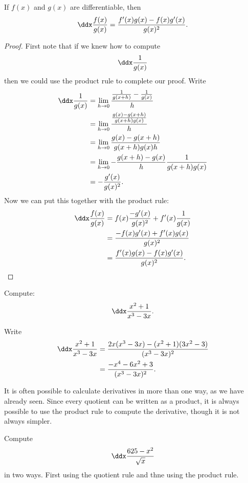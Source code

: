 \begin{mainTheorem}\label{theorem:quotient-rule}
If $f(x)$ and $g(x)$ are differentiable, then
\[
\ddx \frac{f(x)}{g(x)} = \frac{f'(x)g(x)-f(x)g'(x)}{g(x)^2}.
\]
\end{mainTheorem}
\begin{proof}
First note that if we knew how to compute
\[
\ddx \frac{1}{g(x)}
\]
then we could use the product rule to complete our proof.  Write
\begin{align*}
\ddx\frac{1}{g(x)}&=\lim_{h\to0} \frac{\frac{1}{g(x+h)}-\frac{1}{g(x)}}{h} \\
&=\lim_{h\to0} \frac{\frac{g(x)-g(x+h)}{g(x+h)g(x)}}{h} \\
&=\lim_{h\to0} \frac{g(x)-g(x+h)}{g(x+h)g(x)h} \\
&=\lim_{h\to0} -\frac{g(x+h)-g(x)}{h} \frac{1}{g(x+h)g(x)} \\
&=-\frac{g'(x)}{g(x)^2}.
\end{align*}
Now we can put this together with the product rule:
\begin{align*}
\ddx\frac{f(x)}{g(x)} &=f(x)\frac{-g'(x)}{g(x)^2}+f'(x)\frac{1}{g(x)}\\
&=\frac{-f(x)g'(x)+f'(x)g(x)}{g(x)^2}\\
&=\frac{f'(x)g(x)-f(x)g'(x)}{g(x)^2}.
\end{align*}

\end{proof}


\begin{example}
Compute:
\[
\ddx \frac{x^2+1}{x^3-3x}.
\]
\end{example}

\begin{solution}
Write
\begin{align*}
\ddx \frac{x^2+1}{x^3-3x} &= \frac{2x(x^3-3x)-(x^2+1)(3x^2-3)}{(x^3-3x)^2}\\
&=\frac{-x^4-6x^2+3}{(x^3-3x)^2}.
\end{align*}
\end{solution}

It is often possible to calculate derivatives in more than one way, as
we have already seen. Since every quotient can be written as a
product, it is always possible to use the product rule to compute the
derivative, though it is not always simpler.

\begin{example}
Compute 
\[
\ddx \frac{625-x^2}{\sqrt{x}}
\] 
in two ways. First using the quotient rule and thne using the product
rule.
\end{example}

